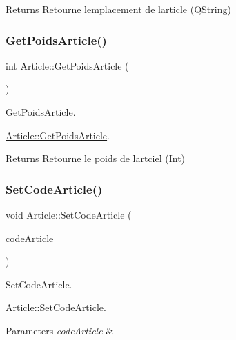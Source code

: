 \begin{DoxyReturn}{Returns}
Retourne l\textquotesingle{}emplacement de l\textquotesingle{}article (Q\+String)


\end{DoxyReturn}
\mbox{\label{class_article_a0509109984e6d86e783c457ce70d13a7}} 
\subsubsection{\texorpdfstring{Get\+Poids\+Article()}{GetPoidsArticle()}}
{\footnotesize\ttfamily int Article\+::\+Get\+Poids\+Article (\begin{DoxyParamCaption}{ }\end{DoxyParamCaption})}



Get\+Poids\+Article. 

\mbox{\hyperlink{class_article_a0509109984e6d86e783c457ce70d13a7}{Article\+::\+Get\+Poids\+Article}}.

\begin{DoxyReturn}{Returns}
Retourne le poids de l\textquotesingle{}artciel (Int)


\end{DoxyReturn}
\mbox{\label{class_article_a5300f5a6247dd931cb411d7ff1721d7f}} 
\subsubsection{\texorpdfstring{Set\+Code\+Article()}{SetCodeArticle()}}
{\footnotesize\ttfamily void Article\+::\+Set\+Code\+Article (\begin{DoxyParamCaption}\item[{Q\+String}]{code\+Article }\end{DoxyParamCaption})}



Set\+Code\+Article. 

\mbox{\hyperlink{class_article_a5300f5a6247dd931cb411d7ff1721d7f}{Article\+::\+Set\+Code\+Article}}.


\begin{DoxyParams}{Parameters}
{\em code\+Article} & \\
\hline
\end{DoxyParams}
\mbox{\label{class_article_a6ee68c7584a20323039ab5065c34eb81}} 

